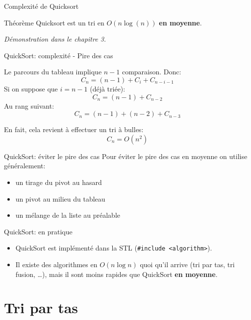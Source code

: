 \begin{frame}{Complexité de Quicksort}

\begin{block}{Théorème}
Quicksort est un tri en $O(n\log(n))$ \textbf{en moyenne}.
\end{block}

\vspace{1cm}
\textit{Démonstration dans le chapitre 3.}

\end{frame}


\begin{frame}{QuickSort: complexité - Pire des cas}

Le parcours du tableau implique $n-1$ comparaison. Donc:
$$ C_n = (n-1) + C_i + C_{n-i-1}$$
Si on suppose que $i = n-1$ (déjà triée):
$$ C_n = (n-1) + C_{n-2}$$
Au rang suivant:
$$ C_n = (n-1) + (n-2)+ C_{n-3}$$

En fait, cela revient à effectuer un tri à bulles:
$$C_n = O(n^2)$$
\end{frame}

\begin{frame}{QuickSort: éviter le pire des cas}
Pour éviter le pire des cas en moyenne on utilise généralement:
\begin{itemize}
\item un tirage du pivot au hasard
\item un pivot au milieu du tableau
\item un mélange de la liste au préalable
\end{itemize}
\end{frame}

\begin{frame}{QuickSort: en pratique}

\begin{itemize}
\item QuickSort est implémenté dans la STL (\texttt{\#include <algorithm>}).
\item Il existe des algorithmes en $O(n \log{n})$ quoi qu'il arrive (tri par tas, tri fusion, \dots), mais il sont moins rapides que QuickSort \textbf{en moyenne}.
\end{itemize}

\end{frame}

\section{Tri par tas}

